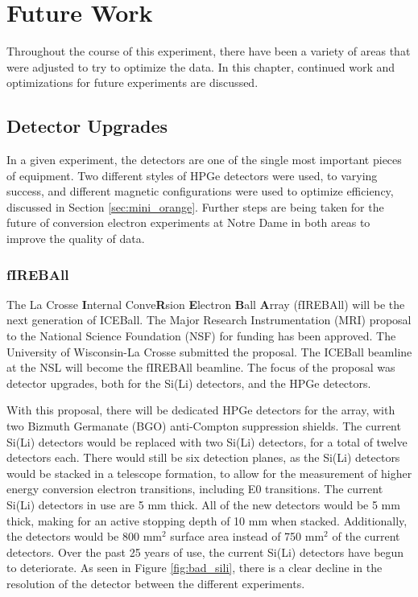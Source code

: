 
%
%

\chapter{Future Work}

Throughout the course of this experiment, there have been a variety of areas that were adjusted to try to optimize the data. In this chapter, continued work and optimizations for future experiments are discussed.

\section{Detector Upgrades}

In a given experiment, the detectors are one of the single most important pieces of equipment. Two different styles of HPGe detectors were used, to varying success, and different magnetic configurations were used to optimize efficiency, discussed in Section \ref{sec:mini_orange}. Further steps are being taken for the future of conversion electron experiments at Notre Dame in both areas to improve the quality of data.

\subsection{fIREBAll}

The La Crosse \textbf{I}nternal Conve\textbf{R}sion \textbf{E}lectron \textbf{B}all \textbf{A}rray (fIREBAll) will be the next generation of ICEBall\citep{lesher19:_fireball}. The Major Research Instrumentation (MRI) proposal to the National Science Foundation (NSF) for funding has been approved. The University of Wisconsin-La Crosse submitted the proposal. The ICEBall beamline at the NSL will become the fIREBAll beamline. The focus of the proposal was detector upgrades, both for the Si(Li) detectors, and the HPGe detectors.

With this proposal, there will be dedicated HPGe detectors for the array, with two Bizmuth Germanate (BGO) anti-Compton suppression shields. The current Si(Li) detectors would be replaced with two Si(Li) detectors, for a total of twelve detectors each. There would still be six detection planes, as the Si(Li) detectors would be stacked in a telescope formation, to allow for the measurement of higher energy conversion electron transitions, including E0 transitions. The current Si(Li) detectors in use are 5 mm thick. All of the new detectors would be 5 mm thick, making for an active stopping depth of 10 mm when stacked. Additionally, the detectors would be 800 mm$^2$ surface area instead of 750 mm$^2$ of the current detectors. Over the past 25 years of use, the current Si(Li) detectors have begun to deteriorate. As seen in Figure \ref{fig:bad_sili}, there is a clear decline in the resolution of the detector between the different experiments.

